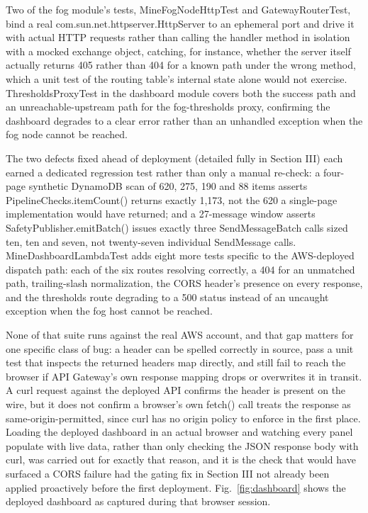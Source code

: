 \documentclass[conference]{IEEEtran}
\begin{document}
Two of the fog module's tests, MineFogNodeHttpTest and GatewayRouterTest, bind a real com.sun.net.httpserver.HttpServer to an ephemeral port and drive it with actual HTTP requests rather than calling the handler method in isolation with a mocked exchange object, catching, for instance, whether the server itself actually returns 405 rather than 404 for a known path under the wrong method, which a unit test of the routing table's internal state alone would not exercise. ThresholdsProxyTest in the dashboard module covers both the success path and an unreachable-upstream path for the fog-thresholds proxy, confirming the dashboard degrades to a clear error rather than an unhandled exception when the fog node cannot be reached.

The two defects fixed ahead of deployment (detailed fully in Section III) each earned a dedicated regression test rather than only a manual re-check: a four-page synthetic DynamoDB scan of 620, 275, 190 and 88 items asserts PipelineChecks.itemCount() returns exactly 1,173, not the 620 a single-page implementation would have returned; and a 27-message window asserts SafetyPublisher.emitBatch() issues exactly three SendMessageBatch calls sized ten, ten and seven, not twenty-seven individual SendMessage calls. MineDashboardLambdaTest adds eight more tests specific to the AWS-deployed dispatch path: each of the six routes resolving correctly, a 404 for an unmatched path, trailing-slash normalization, the CORS header's presence on every response, and the thresholds route degrading to a 500 status instead of an uncaught exception when the fog host cannot be reached.

None of that suite runs against the real AWS account, and that gap matters for one specific class of bug: a header can be spelled correctly in source, pass a unit test that inspects the returned headers map directly, and still fail to reach the browser if API Gateway's own response mapping drops or overwrites it in transit. A curl request against the deployed API confirms the header is present on the wire, but it does not confirm a browser's own fetch() call treats the response as same-origin-permitted, since curl has no origin policy to enforce in the first place. Loading the deployed dashboard in an actual browser and watching every panel populate with live data, rather than only checking the JSON response body with curl, was carried out for exactly that reason, and it is the check that would have surfaced a CORS failure had the gating fix in Section III not already been applied proactively before the first deployment. Fig.~\ref{fig:dashboard} shows the deployed dashboard as captured during that browser session.
\end{document}
